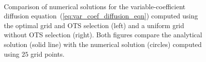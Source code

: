 \documentclass[twocolumn]{article} %
\begin{document}
\begin{figure}[tbh]
\begin{center}
 \ 
\caption{Comparison of numerical solutions for the variable-coefficient
diffusion equation~(\ref{eq:var_coef_diffusion_eqn}) computed using 
the optimal grid and OTS selection (left) and a uniform grid without OTS
selection (right).  Both figures compare the analytical solution (solid line)
with the numerical solution (circles) computed using $25$ grid points.
}
\label{fig:var_coef_diffusion_eqn_1d_solns}
\end{center}
\end{figure}
\end{document}
